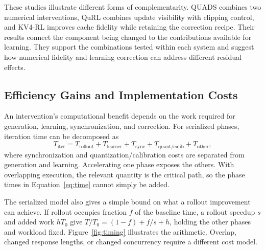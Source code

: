 These studies illustrate different forms of complementarity. QUADS combines two numerical interventions, QuRL combines update visibility with clipping control, and KV4-RL improves cache fidelity while retaining the correction recipe. Their results connect the component being changed to the contributions available for learning. They support the combinations tested within each system and suggest how numerical fidelity and learning correction can address different residual effects.

\subsection{Efficiency Gains and Implementation Costs}
An intervention's computational benefit depends on the work required for generation, learning, synchronization, and correction. For serialized phases, iteration time can be decomposed as
\begin{equation}\label{eq:time}
T_{\mathrm{iter}}=T_{\mathrm{rollout}}+T_{\mathrm{learner}}+T_{\mathrm{sync}}+
T_{\mathrm{quant/calib}}+T_{\mathrm{other}},
\end{equation}
where synchronization and quantization/calibration costs are separated from generation and learning. Accelerating one phase exposes the others. With overlapping execution, the relevant quantity is the critical path, so the phase times in Equation~\eqref{eq:time} cannot simply be added.

The serialized model also gives a simple bound on what a rollout improvement can achieve. If rollout occupies fraction $f$ of the baseline time, a rollout speedup $s$ and added work $hT_0$ give $T/T_0=(1-f)+f/s+h$, holding the other phases and workload fixed. Figure~\ref{fig:timing} illustrates the arithmetic. Overlap, changed response lengths, or changed concurrency require a different cost model.

